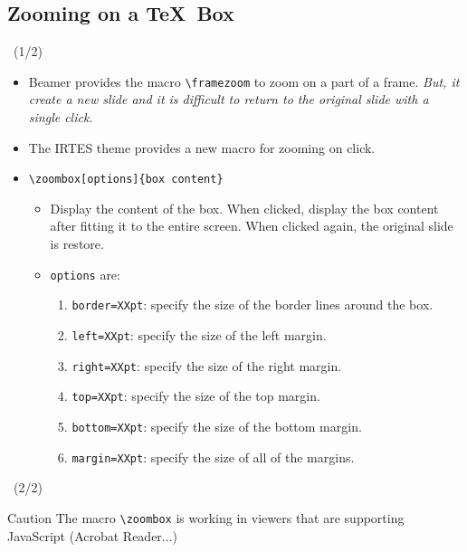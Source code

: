 \documentclass[english,circlenumberstyle]{irtesbeamer}
\begin{document}
\subsection{Zooming on a \TeX\ Box}
\begin{frame}{\subsecname\ (1/2)}
	\begin{itemize}
	\item Beamer provides the macro \texttt{{\textbackslash}framezoom} to zoom on a part of a frame. \emph{But, it create a new slide and it is difficult to return to the original slide with a single click}.	
	\item The IRTES theme provides a new macro for zooming on click.
	\item \texttt{{\textbackslash}zoombox[options]\{box content\}}
		\begin{itemize}
		\item Display the content of the box. When clicked, display the box content after fitting it to the entire screen. When clicked again, the original slide is restore.
		\item \texttt{options} are:
			\begin{enumerate}
			\item \texttt{border=XXpt}: specify the size of the border lines around the box.
			\item \texttt{left=XXpt}: specify the size of the left margin.
			\item \texttt{right=XXpt}: specify the size of the right margin.
			\item \texttt{top=XXpt}: specify the size of the top margin.
			\item \texttt{bottom=XXpt}: specify the size of the bottom margin.
			\item \texttt{margin=XXpt}: specify the size of all of the margins.
			\end{enumerate}
		\end{itemize}
	\end{itemize}
\end{frame}

\begin{frame}{\subsecname\ (2/2)}
	\begin{alertblock}{Caution}
	The macro \texttt{{\textbackslash}zoombox} is working in viewers that are supporting JavaScript (Acrobat Reader...)
	\end{alertblock}
	\vfill
	\begin{center}
	\end{center}
\end{frame}
\end{document}
